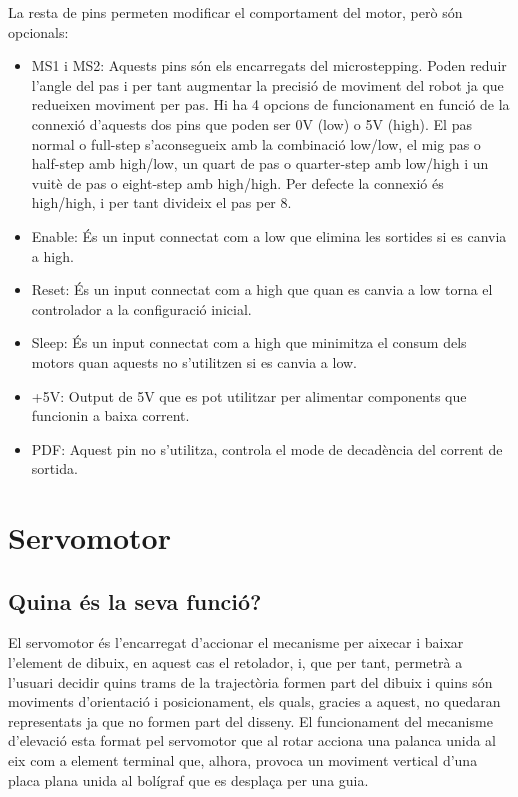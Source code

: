 La resta de pins permeten modificar el comportament del motor, però són opcionals:

\begin{itemize}
	
	\item MS1 i MS2: Aquests pins són els encarregats del microstepping. Poden reduir l'angle del pas i per tant augmentar la precisió de moviment del robot ja que redueixen moviment per pas. Hi ha 4 opcions de funcionament en funció de la connexió d'aquests dos pins que poden ser 0V (low) o 5V (high). El pas normal o full-step s'aconsegueix amb la combinació low/low, el mig pas o half-step amb high/low, un quart de pas o quarter-step amb low/high i un vuitè de pas o eight-step amb high/high. Per defecte la connexió és high/high, i per tant divideix el pas per 8. 
	
	\item Enable: És un input connectat com a low que elimina les sortides si es canvia a high.
	
	\item Reset: És un input connectat com a high que quan es canvia a low torna el controlador a la configuració inicial. 
	
	\item Sleep: És un input connectat com a high que minimitza el consum dels motors quan aquests no s'utilitzen si es canvia a low.
	
	\item +5V: Output de 5V que es pot utilitzar per alimentar components que funcionin a baixa corrent. 
	
	\item PDF: Aquest pin no s'utilitza, controla el mode de decadència del corrent de sortida.
	
\end{itemize}


\section {Servomotor}

\subsection{Quina és la seva funció?}

El servomotor és l’encarregat d’accionar el mecanisme per aixecar i baixar l’element de dibuix, en aquest cas el retolador, i, que per tant, permetrà a l’usuari decidir quins trams de la trajectòria formen part del dibuix i quins són moviments d’orientació i posicionament, els quals, gracies a aquest, no quedaran representats ja que no formen part del disseny. El funcionament del mecanisme d’elevació esta format pel servomotor que al rotar acciona una palanca unida al eix com a element terminal que, alhora, provoca un moviment vertical d’una placa plana unida al bolígraf que es desplaça per una guia.  

